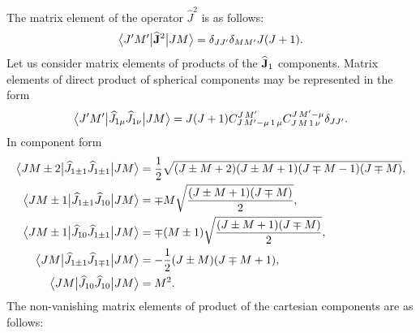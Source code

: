 The matrix element of the operator \(\widehat{J}^{2}\) is as follows:
\begin{equation}
\bigl\langle  J^{\prime} M^{\prime} \big|  \widehat{\mathbf{J}}^{2} \big| J M \bigr\rangle=\delta_{J J^{\prime}} \delta_{M M^{\prime}} J(J+1). \label{eq:13:2:43}
\end{equation}
Let us consider matrix elements of products of the \(\widehat{\mathbf{J}}_{1}\) components. Matrix elements of direct product of spherical components may be represented in the form
\begin{equation}
\bigl\langle  J^{\prime} M^{\prime} \big|  \widehat{J}_{1 \mu} \widehat{J}_{1 \nu} \big| J M \bigr\rangle=J(J+1) 
C_{J\,M^{\prime}-\mu\,1\,\mu}^{J\,M^{\prime}} 
C_{J\,M\,1\,\nu}^{J\,M^{\prime}-\mu} \delta_{J J^{\prime}}. \label{eq:13:2:44}
\end{equation}
In component form
\begin{align}
\bigl\langle  J M \pm 2 \big|  \widehat{J}_{1 \pm 1} \widehat{J}_{1 \pm 1} \big| J M \bigr\rangle & =\frac{1}{2} \sqrt{(J \pm M+2)(J \pm M+1)(J \mp M-1)(J \mp M)}, \notag\\
\bigl\langle  J M \pm 1 \big|  \widehat{J}_{1 \pm 1} \widehat{J}_{10} \big| J M \bigr\rangle & =\mp M \sqrt{\frac{(J \pm M+1)(J \mp M)}{2}}, \notag\\
\bigl\langle  J M \pm 1 \big|  \widehat{J}_{10} \widehat{J}_{1 \pm 1} \big| J M \bigr\rangle & =\mp(M \pm 1) \sqrt{\frac{(J \pm M+1)(J \mp M)}{2}},  \label{eq:13:2:45}\\
\bigl\langle  J M \big|  \widehat{J}_{1 \pm 1} \widehat{J}_{1 \mp 1} \big| J M \bigr\rangle & =-\frac{1}{2}(J \pm M)(J \mp M+1), \notag\\
\bigl\langle  J M \big|  \widehat{J}_{10} \widehat{J}_{10} \big| J M \bigr\rangle & =M^{2}. \notag
\end{align}
The non-vanishing matrix elements of product of the cartesian components are as follows:
